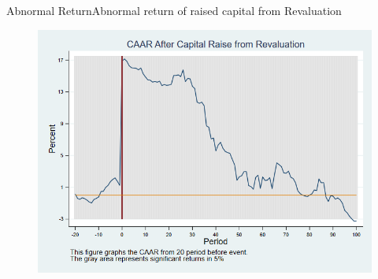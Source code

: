 \documentclass{beamer}
\begin{document}
%		
	
	
	
	
	
	\begin{frame}{Abnormal Return}{Abnormal return of raised capital from Revaluation}
		\label{abreturnrevalution}
		\begin{figure}
			\centering
			\includegraphics[width=0.65\linewidth]{Output/CARRevaluation.png}
			\label{fig:abreturnrevalution}
		\end{figure}

	\end{frame}
	
\end{document}
